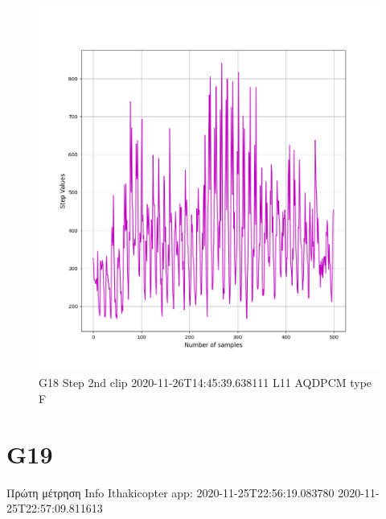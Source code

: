 \documentclass[hidelinks, 12pt, a4paper]{article}
\begin{document}
\begin{figure}[h!]
\centering
	\includegraphics[height=.4\textheight, width=\textwidth]{assets/session1/g18.png}
    \caption{G18 Step 2nd clip   2020-11-26T14:45:39.638111  L11 AQDPCM type F}
\end{figure}



\section{G19}
Πρώτη μέτρηση
Info Ithakicopter app:
2020-11-25T22:56:19.083780
2020-11-25T22:57:09.811613
\end{document}
